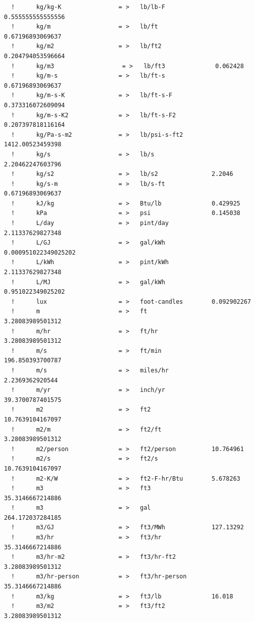 \begin{lstlisting}
  !      kg/kg-K                = >   lb/lb-F             0.555555555555556
  !      kg/m                   = >   lb/ft               0.67196893069637
  !      kg/m2                  = >   lb/ft2              0.204794053596664
  !      kg/m3                   = >   lb/ft3              0.062428
  !      kg/m-s                 = >   lb/ft-s             0.67196893069637
  !      kg/m-s-K               = >   lb/ft-s-F           0.373316072609094
  !      kg/m-s-K2              = >   lb/ft-s-F2          0.207397818116164
  !      kg/Pa-s-m2             = >   lb/psi-s-ft2        1412.00523459398
  !      kg/s                   = >   lb/s                2.20462247603796
  !      kg/s2                  = >   lb/s2               2.2046
  !      kg/s-m                 = >   lb/s-ft             0.67196893069637
  !      kJ/kg                  = >   Btu/lb              0.429925
  !      kPa                    = >   psi                 0.145038
  !      L/day                  = >   pint/day            2.11337629827348
  !      L/GJ                   = >   gal/kWh             0.000951022349025202
  !      L/kWh                  = >   pint/kWh            2.11337629827348
  !      L/MJ                   = >   gal/kWh             0.951022349025202
  !      lux                    = >   foot-candles        0.092902267
  !      m                      = >   ft                  3.28083989501312
  !      m/hr                   = >   ft/hr               3.28083989501312
  !      m/s                    = >   ft/min              196.850393700787
  !      m/s                    = >   miles/hr            2.2369362920544
  !      m/yr                   = >   inch/yr             39.3700787401575
  !      m2                     = >   ft2                 10.7639104167097
  !      m2/m                   = >   ft2/ft              3.28083989501312
  !      m2/person              = >   ft2/person          10.764961
  !      m2/s                   = >   ft2/s               10.7639104167097
  !      m2-K/W                 = >   ft2-F-hr/Btu        5.678263
  !      m3                     = >   ft3                 35.3146667214886
  !      m3                     = >   gal                 264.172037284185
  !      m3/GJ                  = >   ft3/MWh             127.13292
  !      m3/hr                  = >   ft3/hr              35.3146667214886
  !      m3/hr-m2               = >   ft3/hr-ft2          3.28083989501312
  !      m3/hr-person           = >   ft3/hr-person       35.3146667214886
  !      m3/kg                  = >   ft3/lb              16.018
  !      m3/m2                  = >   ft3/ft2             3.28083989501312

\end{lstlisting}
